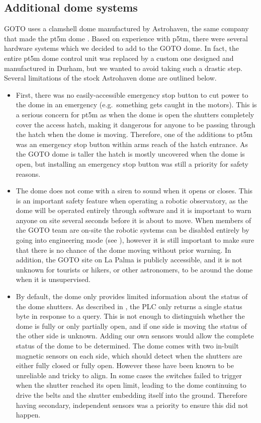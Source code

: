 \subsection{Additional dome systems}
\label{sec:arduino}
\begin{colsection}

GOTO uses a clamshell dome manufactured by Astrohaven, the same company that made the pt5m dome \citep{pt5m}. Based on experience with p5tm, there were several hardware systems which we decided to add to the GOTO dome. In fact, the entire pt5m dome control unit was replaced by a custom one designed and manufactured in Durham, but we wanted to avoid taking such a drastic step. Several limitations of the stock Astrohaven dome are outlined below.
%
\begin{itemize}
    \item First, there was no easily-accessible emergency stop button to cut power to the dome in an emergency (e.g.\ something gets caught in the motors). This is a serious concern for pt5m as when the dome is open the shutters completely cover the access hatch, making it dangerous for anyone to be passing through the hatch when the dome is moving. Therefore, one of the additions to pt5m was an emergency stop button within arms reach of the hatch entrance. As the GOTO dome is taller the hatch is mostly uncovered when the dome is open, but installing an emergency stop button was still a priority for safety reasons.
    \item The dome does not come with a siren to sound when it opens or closes. This is an important safety feature when operating a robotic observatory, as the dome will be operated entirely through software and it is important to warn anyone on site several seconds before it is about to move. When members of the GOTO team are on-site the robotic systems can be disabled entirely by going into engineering mode (see ), however it is still important to make sure that there is no chance of the dome moving without prior warning. In addition, the GOTO site on La Palma is publicly accessible, and it is not unknown for tourists or hikers, or other astronomers, to be around the dome when it is unsupervised.
    \item By default, the dome  only provides limited information about the status of the dome shutters. As described in , the PLC only returns a single status byte in response to a query. This is not enough to distinguish whether the dome is fully or only partially open, and if one side is moving the status of the other side is unknown. Adding our own sensors would allow the complete status of the dome to be determined. The dome comes with two in-built magnetic sensors on each side, which should detect when the shutters are either fully closed or fully open. However these have been known to be unreliable and tricky to align. In some cases the switches failed to trigger when the shutter reached its open limit, leading to the dome continuing to drive the belts and the shutter embedding itself into the ground. Therefore having secondary, independent sensors was a priority to ensure this did not happen.

\end{itemize}
\end{colsection}
